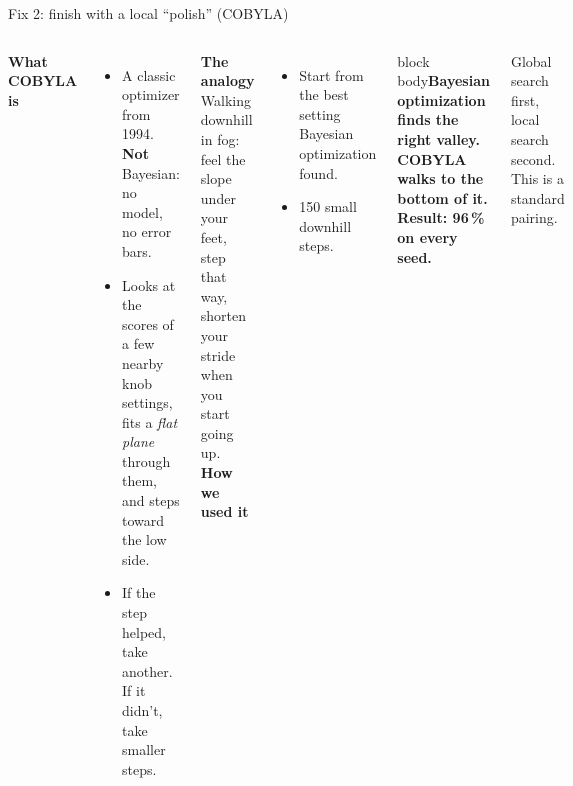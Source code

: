 \documentclass[aspectratio=169,11pt]{beamer}
\newcommand{\takeaway}[1]{\begin{beamercolorbox}[rounded=true,sep=6pt,wd=\textwidth]{block body}\textbf{#1}\end{beamercolorbox}}
\begin{document}
\begin{frame}{Fix 2: finish with a local ``polish'' (COBYLA)}
  \begin{columns}[T]
      \textbf{What COBYLA is}
      \begin{itemize}
        \item A classic optimizer from 1994. \textbf{Not} Bayesian: no model, no error bars.
        \item Looks at the scores of a few nearby knob settings, fits a \emph{flat plane} through them, and steps toward the low side.
        \item If the step helped, take another. If it didn't, take smaller steps.
      \end{itemize}
      \vspace{0.3em}
      \textbf{The analogy}\\
      Walking downhill in fog: feel the slope under your feet, step that way, shorten your stride when you start going up.
      \textbf{How we used it}
      \begin{itemize}
        \item Start from the best setting Bayesian optimization found.
        \item 150 small downhill steps.
      \end{itemize}
      \vspace{0.5em}
      \takeaway{Bayesian optimization finds the right valley. COBYLA walks to the bottom of it. Result: 96\,\% on every seed.}
      \vspace{0.3em}
      \small Global search first, local search second. This is a standard pairing.
  \end{columns}
\end{frame}
\end{document}
